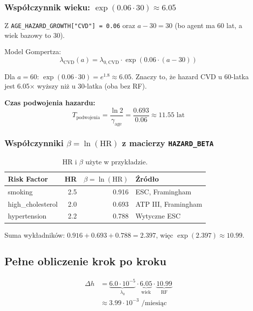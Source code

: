 \documentclass[11pt,a4paper]{article}
\begin{document}
\subsubsection{Współczynnik wieku: $\exp(0.06 \cdot 30) \approx 6.05$}

Z \texttt{AGE\_HAZARD\_GROWTH["CVD"] = 0.06} oraz $a - 30 = 30$ (bo agent ma 60 lat, a wiek bazowy to 30).

Model Gompertza:
\[
\lambda_{\text{CVD}}(a) = \lambda_{0,\text{CVD}} \cdot \exp(0.06 \cdot (a - 30))
\]

Dla $a = 60$: $\exp(0.06 \cdot 30) = e^{1.8} \approx 6.05$. Znaczy to, że hazard CVD u 60-latka jest 6.05$\times$ wyższy niż u 30-latka (oba bez RF).

\textbf{Czas podwojenia hazardu:}
\[
T_{\text{podwojenia}} = \frac{\ln 2}{\gamma_{\text{age}}} = \frac{0.693}{0.06} \approx 11.55 \text{ lat}
\]

\subsubsection{Współczynniki $\beta = \ln(\text{HR})$ z macierzy \texttt{HAZARD\_BETA}}

\begin{table}[h]
\centering
\small
\begin{tabular}{lrrl}
\toprule
\textbf{Risk Factor} & \textbf{HR} & \textbf{$\beta = \ln(\text{HR})$} & \textbf{Źródło} \\
\midrule
smoking            & 2.5 & 0.916 & ESC, Framingham \\
high\_cholesterol  & 2.0 & 0.693 & ATP III, Framingham \\
hypertension       & 2.2 & 0.788 & Wytyczne ESC \\
\bottomrule
\end{tabular}
\caption{HR i $\beta$ użyte w przykładzie.}
\end{table}

Suma wykładników: $0.916 + 0.693 + 0.788 = 2.397$, więc $\exp(2.397) \approx 10.99$.

\subsection{Pełne obliczenie krok po kroku}

\begin{align*}
\Delta h &= \underbrace{6.0 \cdot 10^{-5}}_{\lambda_0} \cdot \underbrace{6.05}_{\text{wiek}} \cdot \underbrace{10.99}_{\text{RF}} \\
         &\approx 3.99 \cdot 10^{-3} \text{ /miesiąc}
\end{align*}
\end{document}
